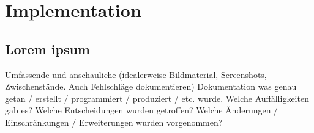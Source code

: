 \chapter{Implementation}

\section{Lorem ipsum}
\label{lorem-ipsum-implementation}

Umfassende und anschauliche (idealerweise Bildmaterial, Screenshots, Zwischenstände. Auch Fehlschläge dokumentieren) Dokumentation was genau getan / erstellt / programmiert / produziert / etc. wurde. Welche Auffälligkeiten gab es? Welche Entscheidungen wurden getroffen? Welche Änderungen / Einschränkungen / Erweiterungen wurden vorgenommen?
